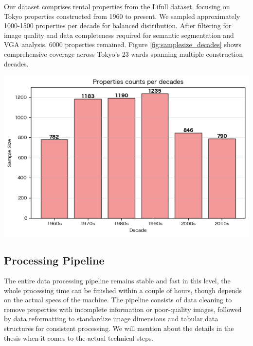 \documentclass[11pt,a4paper]{article}
\begin{document}
\begin{multicols}{2}
Our dataset comprises rental properties from the Lifull dataset, focusing on Tokyo properties 
constructed from 1960 to present. We sampled approximately 1000-1500 properties per decade 
for balanced distribution. After filtering for image quality and data completeness required 
for semantic segmentation and VGA analysis, 6000 properties remained. Figure \ref{fig:samplesize_decades} 
shows comprehensive coverage across Tokyo's 23 wards spanning multiple construction decades.
\begin{center}
    \includegraphics[width=\columnwidth]{plots/samplesize_decades.png}
    \label{fig:samplesize_decades}
\end{center}

\subsection{Processing Pipeline}

The entire data processing pipeline remains stable and fast in this level, the whole 
processing time can be finished within a couple of hours, though depends on the actual specs of the 
machine. The pipeline consists of data cleaning to remove properties with incomplete information or poor-quality images, followed by data reformatting to standardize image dimensions and tabular data structures for consistent processing. We will mention about the details in the thesis when it comes to the actual technical steps.


\end{multicols}
\end{document}
